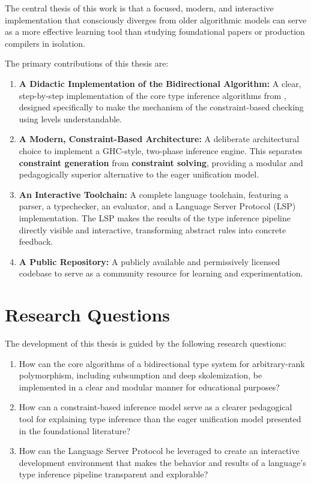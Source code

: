 The central thesis of this work is that a focused, modern, and interactive implementation that consciously diverges from older algorithmic models can serve as a more effective learning tool than studying foundational papers or production compilers in isolation.

The primary contributions of this thesis are:
\begin{enumerate}
    \item \textbf{A Didactic Implementation of the Bidirectional Algorithm:} A clear, step-by-step implementation of the core type inference algorithms from \cite{jones-practical-2007}, designed specifically to make the mechanism of the constraint-based checking using levels understandable.
    \item \textbf{A Modern, Constraint-Based Architecture:} A deliberate architectural choice to implement a GHC-style, two-phase inference engine. This separates \textbf{constraint generation} from \textbf{constraint solving}, providing a modular and pedagogically superior alternative to the eager unification model.
    \item \textbf{An Interactive Toolchain:} A complete language toolchain, featuring a parser, a typechecker, an evaluator, and a Language Server Protocol (LSP) implementation. The LSP makes the results of the type inference pipeline directly visible and interactive, transforming abstract rules into concrete feedback.
    \item \textbf{A Public Repository:} A publicly available and permissively licensed codebase \cite{deemp-arbitrary-rank-tutorial} to serve as a community resource for learning and experimentation.
\end{enumerate}

\newpage
\section{Research Questions}

The development of this thesis is guided by the following research questions:
\begin{enumerate}
    \item How can the core algorithms of a bidirectional type system for arbitrary-rank polymorphism, including subsumption and deep skolemization, be implemented in a clear and modular manner for educational purposes?
    \item How can a constraint-based inference model serve as a clearer pedagogical tool for explaining type inference than the eager unification model presented in the foundational literature?
    \item How can the Language Server Protocol be leveraged to create an interactive development environment that makes the behavior and results of a language's type inference pipeline transparent and explorable?
\end{enumerate}

